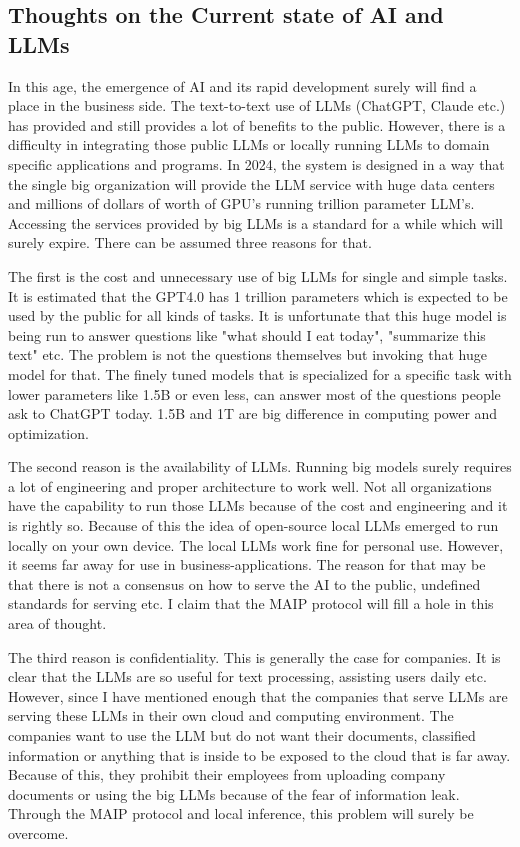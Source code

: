 \documentclass{article}
\begin{document}
\subsection{Thoughts on the Current state of AI and LLMs}

In this age, the emergence of AI and its rapid development surely will find a place in the business side. The text-to-text use of LLMs (ChatGPT, Claude etc.) has provided and still provides a lot of benefits to the public. However, there is a difficulty in integrating those public LLMs or locally running LLMs to domain specific applications and programs. In 2024, the system is designed in a way that the single big organization will provide the LLM service with huge data centers and millions of dollars of worth of GPU's running trillion parameter LLM's. Accessing the services provided by big LLMs is a standard for a while which will surely expire. There can be assumed three reasons for that.\newline

The first is the cost and unnecessary use of big LLMs for single and simple tasks. It is estimated that the GPT4.0 has 1 trillion parameters which is expected to be used by the public for all kinds of tasks. It is unfortunate that this huge model is being run to answer questions like "what should I eat today", "summarize this text" etc. The problem is not the questions themselves but invoking that huge model for that. The finely tuned models that is specialized for a specific task with lower parameters like 1.5B or even less, can answer most of the questions people ask to ChatGPT today. 1.5B and 1T are big difference in computing power and optimization.\newline

The second reason is the availability of LLMs. Running big models surely requires a lot of engineering and proper architecture to work well. Not all organizations have the capability to run those LLMs because of the cost and engineering and it is rightly so. Because of this the idea of open-source local LLMs emerged to run locally on your own device. The local LLMs work fine for personal use. However, it seems far away for use in business-applications. The reason for that may be that there is not a consensus on how to serve the AI to the public, undefined standards for serving etc. I claim that the MAIP protocol will fill a hole in this area of thought.\newline

The third reason is confidentiality. This is generally the case for companies. It is clear that the LLMs are so useful for text processing, assisting users daily etc. However, since I have mentioned enough that the companies that serve LLMs are serving these LLMs in their own cloud and computing environment. The companies want to use the LLM but do not want their documents, classified information or anything that is inside to be exposed to the cloud that is far away. Because of this, they prohibit their employees from uploading company documents or using the big LLMs because of the fear of information leak. Through the MAIP protocol and local inference, this problem will surely be overcome.\newline
\end{document}
